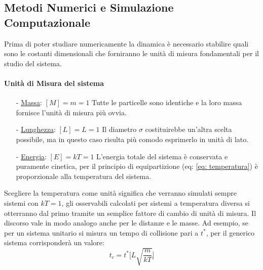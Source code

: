 \documentclass[11pt]{article}
\theoremstyle{plain}
\theoremstyle{remark}
\begin{document}
\subsection{Metodi Numerici e Simulazione Computazionale}
Prima di poter studiare numericamente la dinamica è necessario stabilire quali sono le costanti dimensionali che forniranno le unità di misura fondamentali per il studio del sistema.

\paragraph{Unità di Misura del sistema}
\begin{itemize}
\item[-] \underline{Massa}: $[M]=m=1$ 
\newline Tutte le particelle sono identiche e la loro massa fornisce l'unità di misura più ovvia.

\item[-] \underline{Lunghezza}: $[L]=L=1$ 
\newline Il diametro $\sigma$ costituirebbe un'altra scelta possibile, ma in questo caso risulta più comodo esprimerlo in unità di lato.

\item[-] \underline{Energia}: $[E]=kT=1$ 
\newline L'energia totale del sistema è conservata e puramente cinetica, per il principio di equipartizione (eq: \ref{eq: temperatura}) è proporzionale alla temperatura del sistema. 
\end{itemize}

Scegliere la temperatura come unità significa che verranno simulati sempre sistemi con $kT=1$, gli osservabili calcolati per sistemi a temperatura diversa si otterranno dal primo tramite un semplice fattore di cambio di unità di misura. Il discorso vale in modo analogo anche per le distanze e le masse.
Ad esempio, se per un sistema unitario si misura un tempo di collisione pari a $t^{*}$, per il generico sistema corrisponderà un valore:
\begin{displaymath}
t_c= t^* \biggr[L\sqrt{\dfrac{m}{kT}} \biggr]
\end{displaymath}
\newline\medskip

\FloatBarrier
\end{document}
